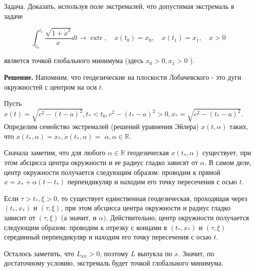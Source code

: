 Задача. Доказать, используя поле экстремалей, что допустимая экстремаль в задаче

$$
\int_{t_{0}}^{t_{1}} \frac{\sqrt{1+\dot{x}^{2}}}{x} d t \rightarrow \operatorname{extr}, \quad x\left(t_{0}\right)=x_{0}, \quad x\left(t_{1}\right)=x_{1}, \quad x>0
$$

является точкой глобального минимума (здесь $x_{0}>0, x_{1}>0$ ).

\textbf{Решение.} Напомним, что геодезические на плоскости Лобачевского - это дуги окружностей с центром на оси $t$.

Пусть $\hat{x}(t)=\sqrt{c^{2}-(t-a)^{2}}, t_{*}<t_{0}, c^{2}-\left(t_{*}-a\right)^{2}>0, x_{*}=\sqrt{c^{2}-\left(t_{*}-a\right)^{2}}$. Определим семейство экстремалей (решений уравнения Эйлера) $x(t, \alpha)$ таких, что $x\left(t_{*}, \alpha\right)=x_{*}, \dot{x}\left(t_{*}, \alpha\right)=$ $\alpha, \alpha \in \mathbb{R}$.

Сначала заметим, что для любого $\alpha \in \mathbb{R}$ геодезическая $x\left(t_{*}, \alpha\right)$ существует, при этом абсцисса центра окружности и ее радиус гладко зависят от $\alpha$. В самом деле, центр окружности получается следующим образом: проводим к прямой $x=x_{*}+\alpha\left(t-t_{*}\right)$ перпендикуляр и находим его точку пересечения с осью $t$.

Если $\tau>t_{*}, \xi>0$, то существует единственная геодезическая, проходящая через $\left(t_{*}, x_{*}\right)$ и $(\tau, \xi)$, при этом абсцисса центра окружности и радиус гладко зависит от $(\tau, \xi)$ (а значит, и $\alpha)$. Действительно, центр окружности получается следующим образом: проводим к отрезку с концами в $\left(t_{*}, x_{*}\right)$ и $(\tau, \xi)$ серединный перпендикуляр и находим его точку пересечения с осью $t$.

Осталось заметить, что $L_{\dot{x} \dot{x}}>0$, поэтому $L$ выпукла по $\dot{x}$. Значит, по достаточному условию, экстремаль будет точкой глобального минимума.